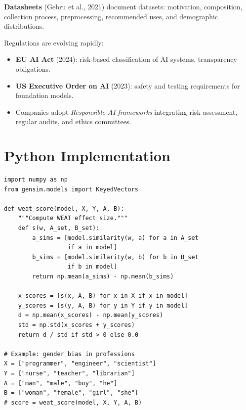 \begin{definition}
\textbf{Datasheets} (Gebru et al., 2021) document datasets: motivation,
composition, collection process, preprocessing, recommended uses, and
demographic distributions.
\end{definition}

\begin{remark}
Regulations are evolving rapidly:
\begin{itemize}
    \item \textbf{EU AI Act} (2024): risk-based classification of AI
    systems, transparency obligations.
    \item \textbf{US Executive Order on AI} (2023): safety and testing
    requirements for foundation models.
    \item Companies adopt \emph{Responsible AI frameworks} integrating
    risk assessment, regular audits, and ethics committees.
\end{itemize}
\end{remark}

\section{Python Implementation}
\label{sec:ethics:code}

\begin{codeblock}[title=\textbf{Bias Detection in Embeddings}]
\begin{verbatim}
import numpy as np
from gensim.models import KeyedVectors

def weat_score(model, X, Y, A, B):
    """Compute WEAT effect size."""
    def s(w, A_set, B_set):
        a_sims = [model.similarity(w, a) for a in A_set
                  if a in model]
        b_sims = [model.similarity(w, b) for b in B_set
                  if b in model]
        return np.mean(a_sims) - np.mean(b_sims)

    x_scores = [s(x, A, B) for x in X if x in model]
    y_scores = [s(y, A, B) for y in Y if y in model]
    d = np.mean(x_scores) - np.mean(y_scores)
    std = np.std(x_scores + y_scores)
    return d / std if std > 0 else 0.0

# Example: gender bias in professions
X = ["programmer", "engineer", "scientist"]
Y = ["nurse", "teacher", "librarian"]
A = ["man", "male", "boy", "he"]
B = ["woman", "female", "girl", "she"]
# score = weat_score(model, X, Y, A, B)
\end{verbatim}
\end{codeblock}

